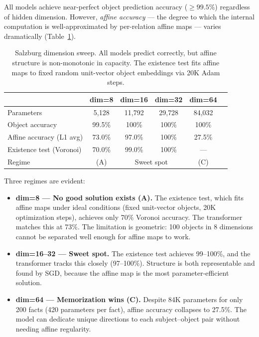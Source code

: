\documentclass[11pt]{article}
\begin{document}
All models achieve near-perfect object prediction accuracy ($\geq 99.5\%$) regardless
of hidden dimension. However, \emph{affine accuracy} --- the degree to which the
internal computation is well-approximated by per-relation affine maps --- varies
dramatically (Table~\ref{tab:salzburg}).

\begin{table}[h]
\centering
\caption{Salzburg dimension sweep. All models predict correctly, but affine structure
is non-monotonic in capacity. The existence test fits affine maps to fixed random
unit-vector object embeddings via 20K Adam steps.}
\label{tab:salzburg}
\begin{tabular}{lccccl}
\toprule
& dim=8 & dim=16 & dim=32 & dim=64 & \\
\midrule
Parameters & 5{,}128 & 11{,}792 & 29{,}728 & 84{,}032 & \\
Object accuracy & 99.5\% & 100\% & 100\% & 100\% & \\
Affine accuracy (L1 avg) & 73.0\% & 97.0\% & 100\% & 27.5\% & \\
Existence test (Voronoi) & 70.0\% & 99.0\% & 100\% & --- & \\
\midrule
Regime & \multicolumn{1}{c}{(A)} & \multicolumn{2}{c}{Sweet spot} & \multicolumn{1}{c}{(C)} & \\
\bottomrule
\end{tabular}
\end{table}

Three regimes are evident:

\begin{itemize}
\item \textbf{dim=8 --- No good solution exists (A).} The existence test, which fits
  affine maps under ideal conditions (fixed unit-vector objects, 20K optimization steps),
  achieves only 70\% Voronoi accuracy. The transformer matches this at 73\%. The
  limitation is geometric: 100 objects in 8 dimensions cannot be separated well enough
  for affine maps to work.
\item \textbf{dim=16--32 --- Sweet spot.} The existence test achieves 99--100\%, and the
  transformer tracks this closely (97--100\%). Structure is both representable and found
  by SGD, because the affine map is the most parameter-efficient solution.
\item \textbf{dim=64 --- Memorization wins (C).} Despite 84K parameters for only 200
  facts (420 parameters per fact), affine accuracy collapses to 27.5\%. The model can
  dedicate unique directions to each subject--object pair without needing affine
  regularity.
\end{itemize}
\end{document}
